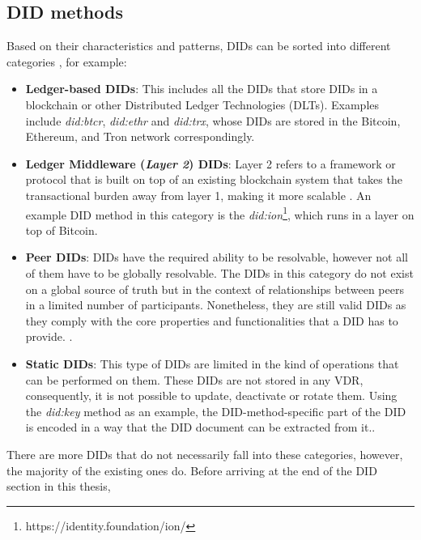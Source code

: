 \subsection{DID methods}\label{subsec:did_methods}

 Based on their characteristics and patterns, DIDs can be sorted into different categories \cite{preukschat_reed_2021}, for example: 

\begin{itemize}
  \item \textbf{Ledger-based DIDs}: This includes all the DIDs that store DIDs in a blockchain or other Distributed Ledger Technologies (DLTs). Examples include \emph{did:btcr}, \emph{did:ethr} and \emph{did:trx}, whose DIDs are stored in the Bitcoin, Ethereum, and Tron network correspondingly.
  \item \textbf{Ledger Middleware (\emph{Layer 2}) DIDs}: Layer 2 refers to a framework or protocol that is built on top of an existing blockchain system that takes the transactional burden away from layer 1, making it more scalable \cite{weston_2022}. An example DID method in this category is the \emph{did:ion}\footnote{https://identity.foundation/ion/}, which runs in a layer on top of Bitcoin. 
  \item \textbf{Peer DIDs}: DIDs have the required ability to be resolvable, however not all of them have to be globally resolvable. The DIDs in this category do not exist on a global source of truth but in the context of relationships between peers in a limited number of participants. Nonetheless, they are still valid DIDs as they comply with the core properties and functionalities that a DID has to provide. \cite{preukschat_reed_2021}.
  \item \textbf{Static DIDs}: This type of DIDs are limited in the kind of operations that can be performed on them. These DIDs are not stored in any VDR, consequently, it is not possible to update, deactivate or rotate them. Using the \emph{did:key} method as an example, the DID-method-specific part of the DID is encoded in a way that the DID document can be extracted from it.\cite{longley_zagidulin_sporny_2022}.
\end{itemize}

There are more DIDs that do not necessarily fall into these categories, however, the majority of the existing ones do. Before arriving at the end of the DID section in this thesis, 



